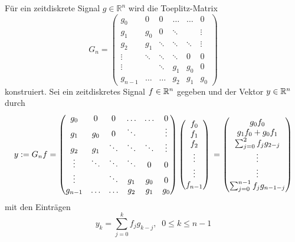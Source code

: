 Für ein zeitdiskrete Signal $g \in \mathbb{R}^{n}$ wird die Toeplitz-Matrix 
\begin{equation*} 
    G_n=\begin{pmatrix}
        g_0 & 0 &0 &\ldots &\ldots &0 \\ 
        g_1 & g_0 &0 &\ddots & &\vdots \\
        g_2 & g_1 &\ddots &\ddots &\ddots &\vdots\\
        \vdots & \ddots &\ddots &\ddots &0 &0\\
        \vdots & &\ddots &g_1 &g_0 &0 \\
        g_{n-1} &\ldots &\ldots &g_{2} &g_{1} &g_0
    \end{pmatrix}
\end{equation*}
konstruiert. Sei ein zeitdiskretes Signal $f \in \mathbb{R}^{n}$ gegeben und der Vektor $y \in \mathbb{R}^n$ durch
\begin{equation*}
    y:=G_n f =\begin{pmatrix}
        g_0 & 0 &0 &\ldots &\ldots &0 \\ 
        g_1 & g_0 &0 &\ddots & &\vdots \\
        g_2 & g_1 &\ddots &\ddots &\ddots &\vdots\\
        \vdots & \ddots &\ddots &\ddots &0 &0\\
        \vdots & &\ddots &g_1 &g_0 &0 \\
        g_{n-1} &\ldots &\ldots &g_{2} &g_{1} &g_0
    \end{pmatrix}
    \begin{pmatrix}
        f_0 \\
        f_1 \\
        f_2 \\
        \vdots \\
        \vdots \\
        f_{n-1}
    \end{pmatrix} \\
    = \begin{pmatrix}
        g_0 f_0 \\
        g_1 f_0+ g_0 f_1 \\
        \sum_{j=0}^2 f_j g_{2-j}  \\
        \vdots \\
        \vdots \\
        \sum_{j=0}^{n-1} f_j g_{n-1-j} 
    \end{pmatrix}
\end{equation*}
mit den Einträgen 
\begin{equation*}
   y_k=\sum_{j=0}^k f_j g_{k-j}, \; \; 0 \leq k \leq n-1
\end{equation*}
